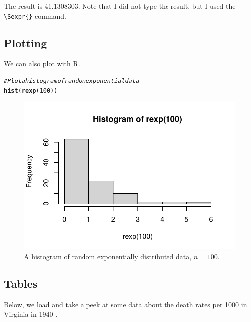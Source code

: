 \documentclass{article}\usepackage[]{graphicx}\usepackage[]{xcolor}
\makeatletter
\def\maxwidth{ %
  \ifdim\Gin@nat@width>\linewidth
    \linewidth
  \else
    \Gin@nat@width
  \fi
}
\newcommand{\hlnum}[1]{\textcolor[rgb]{0.686,0.059,0.569}{#1}}%
\newcommand{\hlcom}[1]{\textcolor[rgb]{0.678,0.584,0.686}{\textit{#1}}}%
\newcommand{\hldef}[1]{\textcolor[rgb]{0.345,0.345,0.345}{#1}}%
\newcommand{\hlkwd}[1]{\textcolor[rgb]{0.737,0.353,0.396}{\textbf{#1}}}%
\newenvironment{kframe}{%
 \def\at@end@of@kframe{}%
 \ifinner\ifhmode%
  \def\at@end@of@kframe{\end{minipage}}%
  \begin{minipage}{\columnwidth}%
 \fi\fi%
 \def\FrameCommand##1{\hskip\@totalleftmargin \hskip-\fboxsep
 \colorbox{shadecolor}{##1}\hskip-\fboxsep
     \hskip-\linewidth \hskip-\@totalleftmargin \hskip\columnwidth}%
 \MakeFramed {\advance\hsize-\width
   \@totalleftmargin\z@ \linewidth\hsize
   \@setminipage}}%
 {\par\unskip\endMakeFramed%
 \at@end@of@kframe}
\newenvironment{knitrout}{}{} %
\makeatother
\begin{document}
\begin{multicols}{2}
The result is 41.1308303. Note that I did not type the result, but I used the \verb|\Sexpr{}| command.

\subsection{Plotting}
We can also plot with R.

\begin{knitrout}\scriptsize
{}\color{fgcolor}\begin{kframe}
\begin{alltt}
\hlcom{#Plot a histogram of random exponential data}
\hlkwd{hist}\hldef{(}\hlkwd{rexp}\hldef{(}\hlnum{100}\hldef{))}
\end{alltt}
\end{kframe}
\end{knitrout}
\begin{figure}[H] \begin{center}
\begin{knitrout}
\color{fgcolor}
\includegraphics[width=\maxwidth]{figure/unnamed-chunk-6-1} 
\end{knitrout}
\caption{A histogram of random exponentially distributed data, $n=100$.} \label{plot1} %
\end{center}
\end{figure}
\columnbreak

\subsection{Tables}
Below, we load and take a peek at some data about the death rates per 1000 in Virginia in 1940 \citep{molyneaux}.


\end{multicols}
\end{document}
